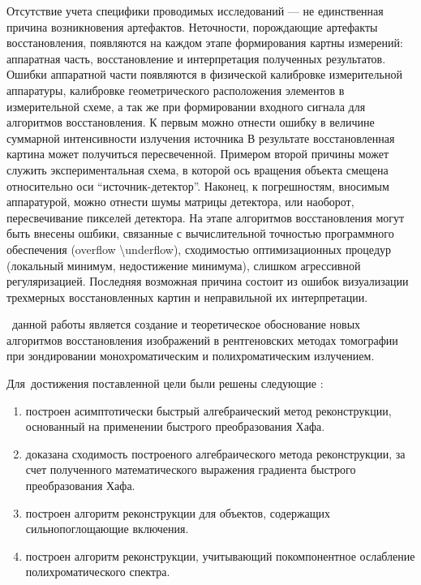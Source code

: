 Отсутствие учета специфики проводимых исследований --- не единственная причина возникновения артефактов. 
Неточности, порождающие артефакты восстановления, появляются на каждом этапе формирования картны измерений: аппаратная часть, восстановление и интерпретация полученных результатов.
Ошибки аппаратной части появляются в физической калибровке измерительной аппаратуры, калибровке геометрического расположения элементов в измерительной схеме, а так же при формировании входного сигнала для алгоритмов восстановления. 
К первым можно отнести ошибку в величине суммарной интенсивности излучения источника
В результате восстановленная картина может получиться пересвеченной.
Примером второй причины может служить экспериментальная схема, в которой ось вращения объекта смещена относительно оси ``источник-детектор''.
Наконец, к погрешностям, вносимым аппаратурой, можно отнести шумы матрицы детектора, или наоборот, пересвечивание пикселей детектора.
На этапе алгоритмов восстановления могут быть внесены ошбики, связанные с вычислительной точностью программного обеспечения (overflow \textbackslash underflow), сходимостью оптимизационных процедур (локальный минимум, недостижение минимума), слишком агрессивной регуляризацией. 
Последняя возможная причина состоит из ошибок визуализации трехмерных восстановленных картин и неправильной их интерпретации.

\aim ~данной работы является создание и теоретическое обоснование новых алгоритмов восстановления изображений в рентгеновских методах томографии при зондировании монохроматическим и полихроматическим излучением.

Для~достижения поставленной цели были решены следующие {\tasks}:
\begin{enumerate}
  \item построен асимптотически быстрый алгебраический метод реконструкции, основанный на применении быстрого преобразования Хафа.
  \item доказана сходимость построеного алгебраического метода реконструкции, за счет полученного математического выражения градиента быстрого преобразования Хафа.
  \item построен алгоритм реконструкции для объектов, содержащих сильнопоглощающие включения.
  \item построен алгоритм реконструкции, учитывающий покомпонентное ослабление полихроматического спектра.
\end{enumerate}

